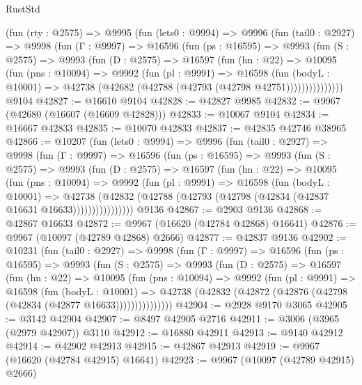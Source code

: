 \begin{lexlean}{RustStd}
\begin{coremodule}
    (fun (rty : @2575) =>
    @9995
      (fun (lets0 : @9994) =>
      @9996
        (fun (tail0 : @2927) =>
        @9998
          (fun (Γ : @9997) =>
          @16596
            (fun (ps : @16595) =>
            @9993
              (fun (S : @2575) =>
              @9993
                (fun (D : @2575) =>
                @16597
                  (fun (hn : @22) =>
                  @10095
                    (fun (pns : @10094) =>
                    @9992
                      (fun (pl : @9991) =>
                      @16598
                        (fun (bodyL : @10001) =>
                        @42738 (@42682 (@42788 (@42793 (@42798 @42751)))))))))))))))
    @9104
@42827 := @16610 @9104
@42828 := @42827 @9985
@42832 := @9967 (@42680 (@16607 (@16609 @42828)))
@42833 := @10067 @9104
@42834 := @16667 @42833
@42835 := @10070 @42833
@42837 := @42835 @42746 @38965
@42866 := @10207
    (fun (lets0 : @9994) =>
    @9996
      (fun (tail0 : @2927) =>
      @9998
        (fun (Γ : @9997) =>
        @16596
          (fun (ps : @16595) =>
          @9993
            (fun (S : @2575) =>
            @9993
              (fun (D : @2575) =>
              @16597
                (fun (hn : @22) =>
                @10095
                  (fun (pns : @10094) =>
                  @9992
                    (fun (pl : @9991) =>
                    @16598
                      (fun (bodyL : @10001) =>
                      @42738
                        (@42832
                          (@42788 (@42793 (@42798 (@42834 (@42837 @16631 @16633))))))))))))))))
    @9136
@42867 := @2903 @9136
@42868 := @42867 @16633
@42872 := @9967 (@16620 (@42784 @42868) @16641)
@42876 := @9967 (@10097 (@42789 @42868) @2666)
@42877 := @42837 @9136
@42902 := @10231
    (fun (tail0 : @2927) =>
    @9998
      (fun (Γ : @9997) =>
      @16596
        (fun (ps : @16595) =>
        @9993
          (fun (S : @2575) =>
          @9993
            (fun (D : @2575) =>
            @16597
              (fun (hn : @22) =>
              @10095
                (fun (pns : @10094) =>
                @9992
                  (fun (pl : @9991) =>
                  @16598
                    (fun (bodyL : @10001) =>
                    @42738 (@42832 (@42872 (@42876 (@42798 (@42834 (@42877 @16633)))))))))))))))
@42904 := @2928 @9170 @3065
@42905 := @3142 @42904
@42907 := @8497 @42905 @2716
@42911 := @3006 (@3965 (@2979 @42907)) @3110
@42912 := @16880 @42911
@42913 := @9140 @42912
@42914 := @42902 @42913
@42915 := @42867 @42913
@42919 := @9967 (@16620 (@42784 @42915) @16641)
@42923 := @9967 (@10097 (@42789 @42915) @2666)

\end{coremodule}
\end{lexlean}
